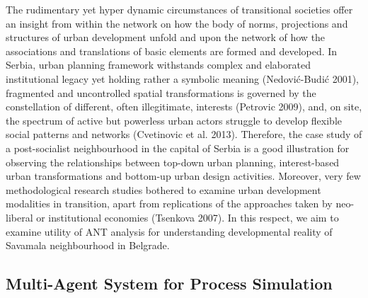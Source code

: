 \documentclass[11pt]{report}
\begin{document}
The rudimentary yet hyper dynamic circumstances of transitional societies offer an insight from within the network on how the body of norms, projections and structures of urban development unfold and upon the network of how the associations and translations of basic elements are formed and developed. In Serbia, urban planning framework withstands complex and elaborated institutional legacy yet holding rather a symbolic meaning (Nedović-Budić 2001), fragmented and uncontrolled spatial transformations is governed by the constellation of different, often illegitimate, interests (Petrovic 2009), and, on site, the spectrum of active but powerless urban actors struggle to develop flexible social patterns and networks (Cvetinovic et al. 2013). Therefore, the case study of a post-socialist neighbourhood in the capital of Serbia is a good illustration for observing the relationships between top-down urban planning, interest-based urban transformations and bottom-up urban design activities. Moreover, very few methodological research studies bothered to examine urban  development modalities  in  transition,  apart  from  replications  of  the  approaches  taken  by  neo-liberal  or institutional economies (Tsenkova 2007). In this respect, we aim to examine utility of ANT analysis for understanding developmental reality of Savamala neighbourhood in Belgrade.

\subsection{Multi-Agent System for Process Simulation}
\end{document}
